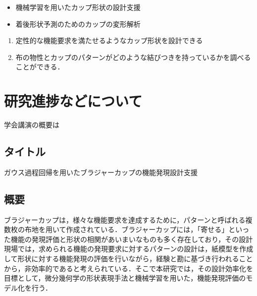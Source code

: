 \documentclass[11pt]{jsarticle}
\begin{document}
	\articleSPRabst
		\begin{itemize}
			\item 機械学習を用いたカップ形状の設計支援
			\item 着後形状予測のためのカップの変形解析
		\end{itemize}
		
		
	\articleSPRobj
		\begin{enumerate}
			\item 定性的な機能要求を満たせるようなカップ形状を設計できる
			\item 布の物性とカップのパターンがどのような結びつきを持っているかを調べることができる．
		\end{enumerate}
	\articleSPRitemsone
		
		\tableofcontents
		
		
	\articleSPRitemstwo
	\renewcommand{\labelitemi}{$\blacktriangledown$}
	\section{研究進捗などについて}
		学会講演の概要は
		
		\subsection{タイトル}
		ガウス過程回帰を用いたブラジャーカップの機能発現設計支援
		\subsection{概要}
		ブラジャーカップは，様々な機能要求を達成するために，パターンと呼ばれる複数枚の布地を用いて作成されている．ブラジャーカップには，「寄せる」といった機能の発現評価と形状の相関があいまいなものも多く存在しており，その設計現場では，求められる機能の発現要求に対するパターンの設計は，紙模型を作成して形状に対する機能発現の評価を行いながら，経験と勘に基づき行われることから，非効率的であると考えられている．そこで本研究では，その設計効率化を目標として，微分幾何学の形状表現手法と機械学習を用いた，機能発現評価のモデル化を行う．
		
	\newpage
\vspace{10cm}

\vspace{14cm}
	\articleSPRfour
	\articleSPRfive
\end{document}
